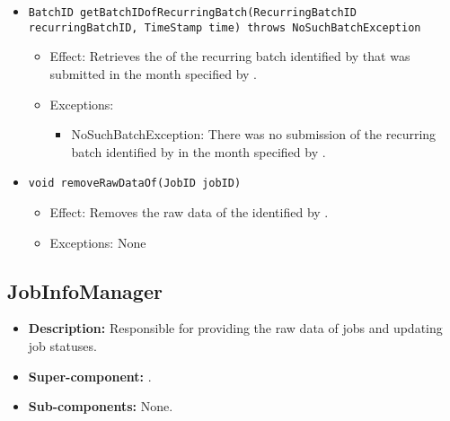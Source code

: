 \begin{itemize}
\begin{itemize}
		\item \texttt{BatchID getBatchIDofRecurringBatch(RecurringBatchID recurringBatchID, TimeStamp time) throws NoSuchBatchException}
		\begin{itemize}
            \item Effect: Retrieves the  of the recurring batch identified by  that was submitted in the month specified by .
            \item Exceptions:
			\begin{itemize}
				\item NoSuchBatchException: There was no submission of the recurring batch identified by  in the month specified by .
			\end{itemize}
        \end{itemize}

		\item \texttt{void removeRawDataOf(JobID jobID)}
		\begin{itemize}
            \item Effect: Removes the raw data of the  identified by .
            \item Exceptions: None
        \end{itemize}
    \end{itemize}
\end{itemize}

\subsection{JobInfoManager}
\begin{itemize}
    \item \textbf{Description:} Responsible for providing the raw data of jobs and updating job statuses.
    \item \textbf{Super-component:} .
    \item \textbf{Sub-components:} None.
\end{itemize}

